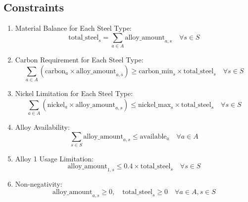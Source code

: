 \documentclass{article}
\begin{document}
\subsection*{Constraints}
\begin{enumerate}
    \item Material Balance for Each Steel Type:
    \[
    \text{total\_steel}_{s} = \sum_{a \in A} \text{alloy\_amount}_{a,s} \quad \forall s \in S
    \]
    
    \item Carbon Requirement for Each Steel Type:
    \[
    \sum_{a \in A} \left( \text{carbon}_{a} \times \text{alloy\_amount}_{a,s} \right) \geq \text{carbon\_min}_{s} \times \text{total\_steel}_{s} \quad \forall s \in S
    \]
    
    \item Nickel Limitation for Each Steel Type:
    \[
    \sum_{a \in A} \left( \text{nickel}_{a} \times \text{alloy\_amount}_{a,s} \right) \leq \text{nickel\_max}_{s} \times \text{total\_steel}_{s} \quad \forall s \in S
    \]
    
    \item Alloy Availability:
    \[
    \sum_{s \in S} \text{alloy\_amount}_{a,s} \leq \text{available}_{a} \quad \forall a \in A
    \]
    
    \item Alloy 1 Usage Limitation:
    \[
    \text{alloy\_amount}_{1,s} \leq 0.4 \times \text{total\_steel}_{s} \quad \forall s \in S
    \]
    
    \item Non-negativity:
    \[
    \text{alloy\_amount}_{a,s} \geq 0, \quad \text{total\_steel}_{s} \geq 0 \quad \forall a \in A, s \in S
    \]
\end{enumerate}
\end{document}
